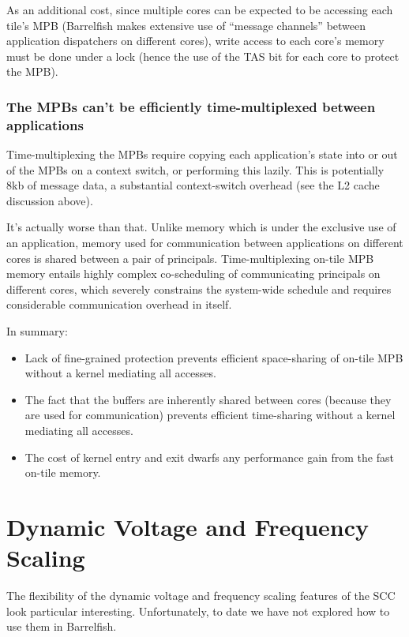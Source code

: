 \documentclass[a4paper,twoside]{report} %
\begin{document}
As an additional cost, since multiple cores can be expected to be
accessing each tile's MPB (Barrelfish makes extensive use of ``message
channels'' between application dispatchers on different cores), write
access to each core's memory must be done under a lock (hence the use
of the TAS bit for each core to protect the MPB). 

\subsubsection{The MPBs can't be efficiently time-multiplexed between
  applications}

Time-multiplexing the MPBs require copying each application's state
into or out of the MPBs on a context switch, or performing this
lazily.   This is potentially 8kb of message data, a substantial
context-switch overhead (see the L2 cache discussion above). 

It's actually worse than that.  Unlike memory which is under the
exclusive use of an application, memory used for communication between
applications on different cores is shared between a pair of
principals.  Time-multiplexing on-tile MPB memory entails highly
complex co-scheduling of communicating principals on different cores,
which severely constrains the system-wide schedule and requires
considerable communication overhead in itself. 

\vspace{12pt}

In summary:
\begin{itemize}
\item Lack of fine-grained protection prevents efficient space-sharing
  of on-tile MPB without a kernel mediating all accesses. 
\item The fact that the buffers are inherently shared between cores
  (because they are used for communication) prevents efficient
  time-sharing without a kernel mediating all accesses. 
\item The cost of kernel entry and exit dwarfs any performance gain
  from the fast on-tile memory. 
\end{itemize}

\section{Dynamic Voltage and Frequency Scaling}

The flexibility of the dynamic voltage and frequency scaling features
of the SCC look particular interesting.  Unfortunately, to date we
have not explored how to use them in Barrelfish. 
\end{document}
